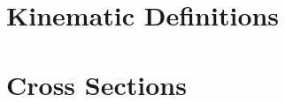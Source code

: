 \label{Chapter-4}

\hypertarget{Section-4.1}{%
\section{Kinematic Definitions}\label{Section-4.1}}

\hypertarget{Section-4.2}{%
\section{Cross Sections}\label{Section-4.2}}


